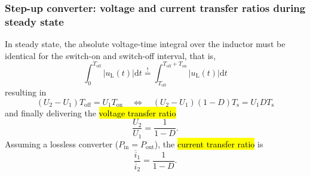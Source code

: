 \begin{frame}
    \frametitle{Step-up converter: voltage and current transfer ratios during steady state}
    In steady state, the absolute voltage-time integral over the inductor must be identical for the switch-on and switch-off interval, that is,
    \begin{equation}
        \int_{0}^{T_\mathrm{off}} \left|u_\mathrm{L}(t)\right| \mathrm{d}t \stackrel{!}{=} \int_{T_\mathrm{off}}^{T_\mathrm{off}+T_\mathrm{on}} \left|u_\mathrm{L}(t)\right| \mathrm{d}t
    \end{equation}
    resulting in
    \begin{equation}
            (U_2-U_1)T_\mathrm{off} = U_1T_\mathrm{on} \quad  \Leftrightarrow \quad  (U_2-U_1)(1-D)T_\mathrm{s} = U_1DT_\mathrm{s}
    \end{equation}
    and finally delivering the \hl{voltage transfer ratio}
    \begin{equation}
        \frac{U_2}{U_1} = \frac{1}{1-D}.
    \end{equation}
    Assuming a lossless converter ($P_\mathrm{in}=P_\mathrm{out}$), the \hl{current transfer ratio} is 
    \begin{equation}
        \frac{\overline{i}_1}{\overline{i}_2} = \frac{1}{1-D}.
    \end{equation}
\end{frame}

